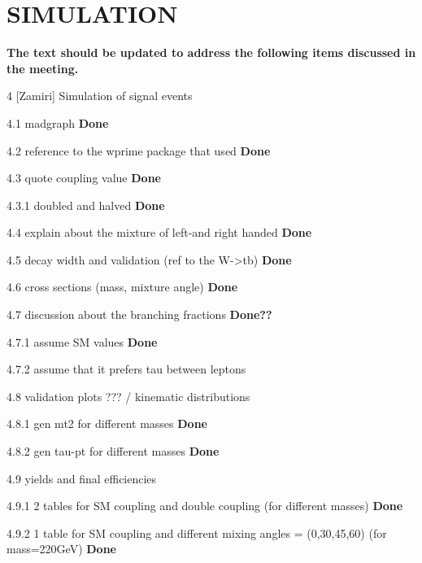 \section{SIMULATION}\label{sec:simulation}

{\bf The text should be updated to address the following items discussed in the meeting.}

4 [Zamiri] Simulation of signal events 

4.1 madgraph {\bf Done}

4.2 reference to the wprime package that used {\bf Done}

4.3 quote coupling value {\bf Done}

4.3.1 doubled and halved {\bf Done}

4.4 explain about the mixture of left-and right handed {\bf Done}

4.5 decay width and validation (ref to the W->tb) {\bf Done}

4.6 cross sections (mass, mixture angle) {\bf Done}

4.7 discussion about the branching fractions {\bf Done??}

4.7.1 assume SM values {\bf Done}

4.7.2 assume that it prefers tau between leptons

4.8 validation plots ??? / kinematic distributions 

4.8.1 gen mt2 for different masses {\bf Done}

4.8.2 gen tau-pt for different masses {\bf Done}

4.9 yields and final efficiencies 

4.9.1 2 tables for SM coupling and double coupling (for different masses)
{\bf Done} 

4.9.2 1 table for SM coupling and different mixing angles = (0,30,45,60) (for mass=220GeV) {\bf Done}


